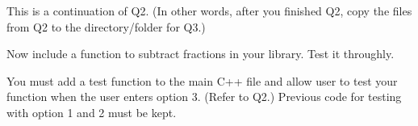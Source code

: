 This is a continuation of Q2.
(In other words, after you finished Q2, copy the files from Q2
to the directory/folder for Q3.)

Now include a function to subtract fractions in your library.
Test it throughly.

You must add a test function to the main C++ file and allow user to test
your function when the user enters option 3. (Refer to Q2.)
Previous code for testing with option 1 and 2 must be kept.

